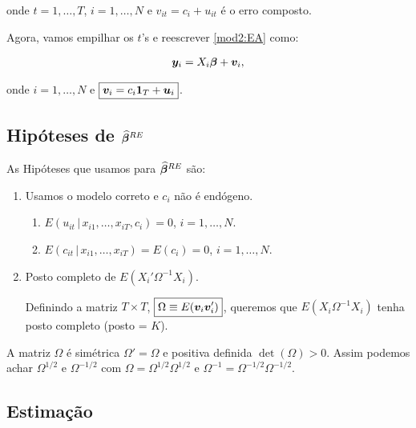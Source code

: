 \documentclass[11pt,oneside,a4paper]{article}
\numberwithin{equation}{section}
\begin{document}
\noindent
onde
$t = 1, \dots, T$, $i = 1, \dots, N$ e $\boxed{v_{it} = c_{i} + u_{it}}$ é o erro composto.

Agora, vamos empilhar os $t$'s e reescrever \eqref{mod2:EA} como:

\vspace{-1 em}
\begin{align} \label{mod3:EA}
	\boldsymbol{y}_{i} = X_{i} \boldsymbol{\beta} + \boldsymbol{v}_{i},
\end{align}

\noindent
onde
$i = 1, \dots, N$ e $\boxed{\boldsymbol{v}_{i} = c_{i} \boldsymbol{1}_{T} + \boldsymbol{u}_{i}}$.

\subsection*{Hipóteses de $\boldsymbol{\widehat{\beta}}^{RE}$}

As Hipóteses que usamos para $\boldsymbol{\widehat{\beta}}^{RE}$ são:

\begin{enumerate} \itemsep0pt
\item  
Usamos o modelo correto e $c_{i}$ não é endógeno.

\begin{enumerate}[label =\alph*)]
\item 
	$E( u_{it} \, | \,  x_{i1}, \dots, x_{iT}, c_{i} ) = 0$,
	$i = 1, \dots, N$.
\item        
	$E( c_{it} \, | \, x_{i1}, \dots, x_{iT} ) = E( c_{i} ) = 0$,
	$i = 1, \dots, N$.
\end{enumerate}

\item  Posto completo de $E( X_{i}' \Omega^{-1} X_{i} )$.

Definindo a matriz $T \times T$, $\boxed{\Omega \equiv E(\boldsymbol{v}_{i} \boldsymbol{v}_{i}')}$, queremos que $E( X_{i} \Omega^{-1} X_{i} )$ tenha posto completo (posto = $K$).
\end{enumerate}

A matriz $\Omega$ é simétrica $\Omega' = \Omega$ e positiva definida $\det(\Omega) > 0$.
Assim podemos achar $\Omega^{1/2}$ e $\Omega^{-1/2}$ com $\Omega = \Omega^{1/2} \Omega^{1/2}$ e $\Omega^{-1} = \Omega^{-1/2} \Omega^{-1/2}$.

\subsection*{Estimação}
\end{document}
